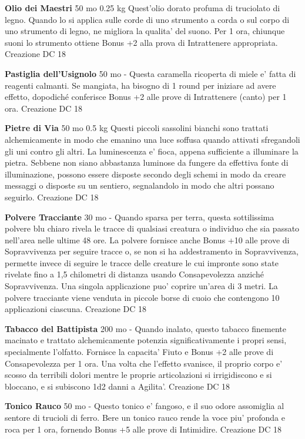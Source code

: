 \documentclass[a4paper,11pt,twoside,openany]{book}
\begin{document}
{\textbf{Olio dei Maestri} 50 mo 0.25 kg Quest'olio dorato profuma di truciolato di legno. Quando lo si applica sulle corde di uno strumento a corda o sul corpo di uno strumento di legno, ne migliora la qualita' del suono. Per 1 ora, chiunque suoni lo strumento ottiene Bonus +2 alla prova di Intrattenere appropriata. Creazione DC 18

\textbf{Pastiglia dell'Usignolo} 50 mo - Questa caramella ricoperta di miele e' fatta di reagenti calmanti. Se mangiata, ha bisogno di 1 round per iniziare ad avere effetto, dopodiché conferisce Bonus +2 alle prove di Intrattenere (canto) per 1 ora. Creazione DC 18

\textbf{Pietre di Via} 50 mo 0.5 kg Questi piccoli sassolini bianchi sono trattati alchemicamente in modo che emanino una luce soffusa quando attivati sfregandoli gli uni contro gli altri. La luminescenza e' fioca, appena sufficiente a illuminare la pietra. Sebbene non siano abbastanza luminose da fungere da effettiva fonte di illuminazione, possono essere disposte secondo degli schemi in modo da creare messaggi o disposte su un sentiero, segnalandolo in modo che altri possano seguirlo. Creazione DC 18

\textbf{Polvere Tracciante} 30 mo - Quando sparsa per terra, questa sottilissima polvere blu chiaro rivela le tracce di qualsiasi creatura o individuo che sia passato nell'area nelle ultime 48 ore. La polvere fornisce anche Bonus +10 alle prove di Sopravvivenza per seguire tracce o, se non si ha addestramento in Sopravvivenza, permette invece di seguire le tracce delle creature le cui impronte sono state rivelate fino a 1,5 chilometri di distanza usando Consapevolezza anziché Sopravvivenza. Una singola applicazione puo' coprire un'area di 3 metri. La polvere tracciante viene venduta in piccole borse di cuoio che contengono 10 applicazioni ciascuna. Creazione DC 18

\textbf{Tabacco del Battipista} 200 mo - Quando inalato, questo tabacco finemente macinato e trattato alchemicamente potenzia significativamente i propri sensi, specialmente l'olfatto. Fornisce la capacita' Fiuto e Bonus +2 alle prove di Consapevolezza per 1 ora. Una volta che l'effetto svanisce, il proprio corpo e' scosso da terribili dolori mentre le proprie articolazioni si irrigidiscono e si bloccano, e si subiscono 1d2 danni a Agilita'. Creazione DC 18

\textbf{Tonico Rauco} 50 mo - Questo tonico e' fangoso, e il suo odore assomiglia al sentore di trucioli di ferro. Bere un tonico rauco rende la voce piu' profonda e roca per 1 ora, fornendo Bonus +5 alle prove di Intimidire. Creazione DC 18

}
\end{document}
